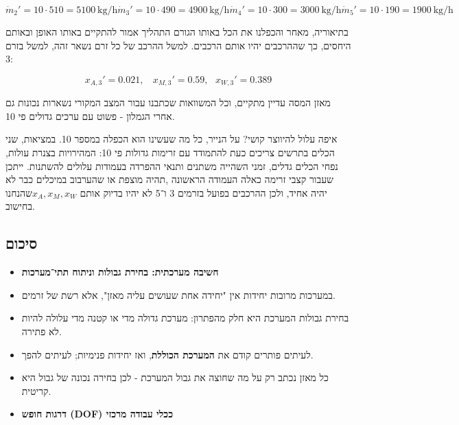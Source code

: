 \documentclass[
  hebrew,
  letterpaper,
  DIV=11,
  numbers=noendperiod]{scrreprt}
\providecommand{\tightlist}{%
  \setlength{\itemsep}{0pt}\setlength{\parskip}{0pt}}
\begin{document}
\[{{\dot{m}}_{2}' = 10 \cdot 510 = 5100\text{ kg/h}
}{{\dot{m}}_{3}' = 10 \cdot 490 = 4900\text{ kg/h}
}{{\dot{m}}_{4}' = 10 \cdot 300 = 3000\text{ kg/h}
}{{\dot{m}}_{5}' = 10 \cdot 190 = 1900\text{ kg/h}
}\]

בתיאוריה, מאחר והכפלנו את הכל באותו הגורם התהליך אמור להתקיים באותו
האופן ובאותם היחסים, כך שההרכבים יהיו אותם הרכבים. למשל ההרכב של כל זרם
נשאר זהה, למשל בזרם 3:

\[x_{A,3}' = 0.021,\ \ \ \ x_{M,3}' = 0.59,\ \ \ x_{W,3}' = 0.389\]

מאזן המסה עדיין מתקיים, וכל המשוואות שכתבנו עבור המצב המקורי נשארות
נכונות גם אחרי הגמלון - פשוט עם ערכים גדולים פי 10.

איפה עלול להיווצר קושי? על הנייר, כל מה שעשינו הוא הכפלה במספר 10.
במציאות, שני הכלים בתרשים צריכים כעת להתמודד עם זרימות גדולות פי 10:
המהירויות בצנרת עולות, נפחי הכלים גדלים, זמני השהייה משתנים ותנאי ההפרדה
בעמודות עלולים להשתנות. ייתכן שעבור קצבי זרימה כאלה העמודה הראשונה ,תהיה
מוצפת או שהערבוב במיכלים כבר לא יהיה אחיד, ולכן ההרכבים בפועל בזרמים 3
ו־5 לא יהיו בדיוק אותם \(x_{A},x_{M},x_{W}\)שהנחנו בחישוב.

\subsection{סיכום}\label{ux5e1ux5d9ux5dbux5d5ux5dd-8}

\begin{itemize}
\tightlist
\item
  \textbf{חשיבה מערכתית: בחירת גבולות וניתוח תתי־מערכות}
\end{itemize}

\begin{itemize}
\item
  במערכות מרובות יחידות אין "יחידה אחת שעושים עליה מאזן", אלא רשת של
  זרמים.
\item
  בחירת גבולות המערכת היא חלק מהפתרון: מערכת גדולה מדי או קטנה מדי עלולה
  להיות לא פתירה.
\item
  לעיתים פותרים קודם את \textbf{המערכת הכוללת}, ואז יחידות פנימיות;
  לעיתים להפך.
\item
  כל מאזן נכתב רק על מה שחוצה את גבול המערכת - לכן בחירה נכונה של גבול
  היא קריטית.
\end{itemize}

\begin{itemize}
\tightlist
\item
  \textbf{דרגות חופש (DOF) ככלי עבודה מרכזי}
\end{itemize}
\end{document}
